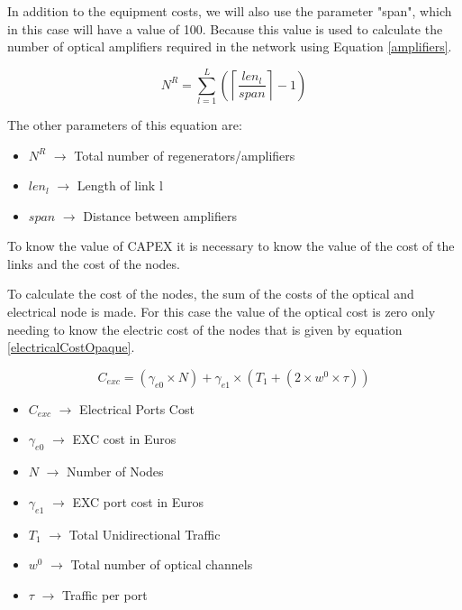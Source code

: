 In addition to the equipment costs, we will also use the parameter "span", which in this case will have a value of 100.
Because this value is used to calculate the number of optical amplifiers required in the network using Equation \ref{amplifiers}.

\begin{equation}
N^R = \sum\limits_{l=1}^L\left(\left\lceil\frac{len_l}{span}\right\rceil-1\right)
\label{amplifiers}
\end{equation}

The other parameters of this equation are:
\begin{itemize}
\item{$N^R$			$\rightarrow$ Total number of regenerators/amplifiers}
\item{$len_l$		$\rightarrow$ Length of link l}
\item{$span$		$\rightarrow$ Distance between amplifiers}	
\end{itemize}	

To know the value of CAPEX it is necessary to know the value of the cost of the links and the cost of the nodes.

To calculate the cost of the nodes, the sum of the costs of the optical and electrical node is made. For this case the value of the optical cost is zero only needing to know the electric cost of the nodes that is given by equation \ref{electricalCostOpaque}.

\begin{equation}
C_{exc} = \left(\gamma_{e0}\times N\right) + \gamma_{e1} \times \left(T_1 + \left(2 \times w^0 \times \tau \right)\right)
\label{electricalCostOpaque}
\end{equation}

\begin{itemize}
\item{$C_{exc}$		$\rightarrow$	Electrical Ports Cost}
\item{$\gamma_{e0}$	$\rightarrow$	EXC cost in Euros}
\item{$N$			$\rightarrow$	Number of Nodes}
\item{$\gamma_{e1}$	$\rightarrow$	EXC port cost in Euros}
\item{$T_1$         $\rightarrow$   Total Unidirectional Traffic}
\item{$w^0$			$\rightarrow$	Total number of optical channels}
\item{$\tau$		$\rightarrow$	Traffic per port}
\end{itemize}

